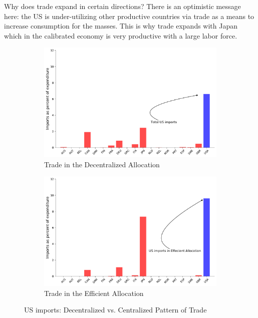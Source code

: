 \documentclass[12pt,pdftex]{article}
\begin{document}
\begin{onehalfspacing}
Why does trade expand in certain directions? There is an optimistic message here: the US is under-utilizing other productive countries via trade as a means to increase consumption for the masses. This is why trade expands with Japan which in the calibrated economy is very productive with a large labor force.

\begin{figure}[!t]
\begin{subfigure}{0.5\textwidth}
    \includegraphics[scale = 0.36]{./figures/decentralized-trade-us.pdf}
    \caption{{Trade in the Decentralized Allocation}}\label{fig:us-data-trade}
\end{subfigure}
\hspace{0.01cm}
\begin{subfigure}{0.5\textwidth}
    \includegraphics[scale = 0.36]{./figures/planner-trade-us.pdf}
    \caption{{Trade in the Efficient Allocation}}\label{fig:us-planner-trade}
\end{subfigure}
\caption{US imports: Decentralized vs. Centralized Pattern of Trade}\label{fig:planner-vs-data}
\end{figure}



\end{onehalfspacing}
\end{document}
